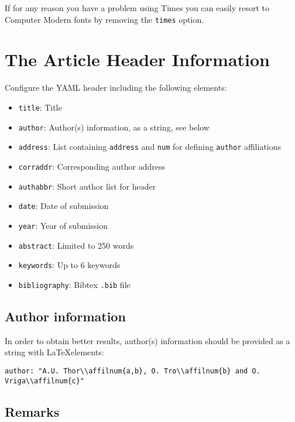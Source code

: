 \documentclass[times,]{simauth}
\begin{document}
If for any reason you have a problem using Times you can easily resort
to Computer Modern fonts by removing the \texttt{times} option.

\section{The Article Header
Information}\label{the-article-header-information}

Configure the YAML header including the following elements:

\begin{itemize}
\item
  \texttt{title}: Title
\item
  \texttt{author}: Author(s) information, as a string, see below
\item
  \texttt{address}: List containing \texttt{address} and \texttt{num}
  for defining \texttt{author} affiliations
\item
  \texttt{corraddr}: Corresponding author address
\item
  \texttt{authabbr}: Short author list for header
\item
  \texttt{date}: Date of submission
\item
  \texttt{year}: Year of submission
\item
  \texttt{abstract}: Limited to 250 words
\item
  \texttt{keywords}: Up to 6 keywords
\item
  \texttt{bibliography}: Bibtex \texttt{.bib} file
\end{itemize}

\subsection{Author information}\label{author-information}

In order to obtain better results, author(s) information should be
provided as a string with \LaTeX elements:

\begin{verbatim}
author: "A.U. Thor\\affilnum{a,b}, O. Tro\\affilnum{b} and O. Vriga\\affilnum{c}"
\end{verbatim}

\subsection{Remarks}\label{remarks}
\end{document}
